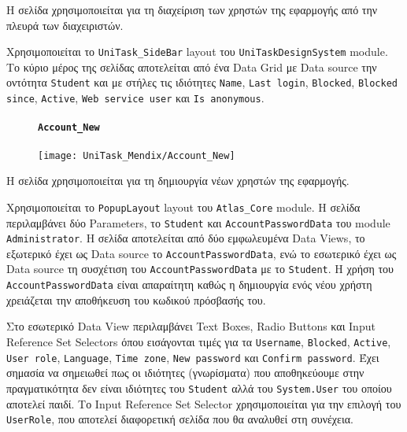                    Η σελίδα χρησιμοποιείται για τη διαχείριση των χρηστών της εφαρμογής από την πλευρά των διαχειριστών.

                    Χρησιμοποιείται το \texttt{UniTask\_SideBar} layout του \texttt{UniTaskDesignSystem} module. Το κύριο μέρος της σελίδας αποτελείται από ένα Data Grid με Data source την οντότητα \texttt{Student} και με στήλες τις ιδιότητες \texttt{Name}, \texttt{Last login}, \texttt{Blocked}, \texttt{Blocked since}, \texttt{Active}, \texttt{Web service user} και \texttt{Is anonymous}.

                \newpage

                \begin{figure}[H] \noindent
                    \paragraph{\texttt{Account\_New}}
                    \begin{center}
                        \texttt{[image: UniTask\_Mendix/Account\_New]}
                    \end{center}
                \end{figure}

                    Η σελίδα χρησιμοποιείται για τη δημιουργία νέων χρηστών της εφαρμογής.

                    Χρησιμοποιείται το \texttt{PopupLayout} layout του \texttt{Atlas\_Core} module. Η σελίδα περιλαμβάνει δύο Parameters, το \texttt{Student} και \texttt{AccountPasswordData} του module \linebreak \texttt{Administrator}. Η σελίδα αποτελείται από δύο εμφωλευμένα Data Views, το εξωτερικό έχει ως Data source το \texttt{AccountPasswordData}, ενώ το εσωτερικό έχει ως Data source τη συσχέτιση του \texttt{AccountPasswordData} με το \texttt{Student}. Η χρήση του \texttt{AccountPasswordData} είναι απαραίτητη καθώς η δημιουργία ενός νέου χρήστη χρειάζεται την αποθήκευση του κωδικού πρόσβασής του.

                    Στο εσωτερικό Data View περιλαμβάνει Text Boxes, Radio Buttons και Input \linebreak Reference Set Selectors όπου εισάγονται τιμές για τα \texttt{Username}, \texttt{Blocked}, \texttt{Active}, \texttt{User role}, \texttt{Language}, \texttt{Time zone}, \texttt{New password} και \texttt{Confirm password}. Έχει σημασία να σημειωθεί πως οι ιδιότητες (γνωρίσματα) που αποθηκεύουμε στην πραγματικότητα δεν είναι ιδιότητες του \texttt{Student} αλλά του \texttt{System.User} του οποίου αποτελεί παιδί. Το Input Reference Set Selector χρησιμοποιείται για την επιλογή του \texttt{UserRole}, που αποτελεί διαφορετική σελίδα που θα αναλυθεί στη συνέχεια.

